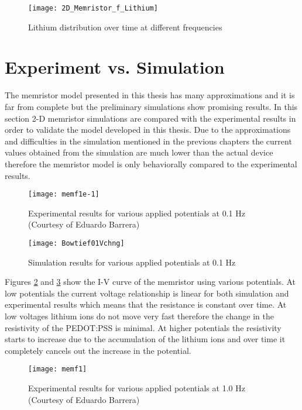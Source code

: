 \begin{doublespace}
\begin{figure}[!htp]
\centering
\texttt{[image: 2D\_Memristor\_f\_Lithium]}
\caption{Lithium distribution over time at different frequencies} 
\label{flit}
\end{figure}


\clearpage
\section{Experiment vs. Simulation}

The memristor model presented in this thesis has many approximations and it is far from complete but the preliminary simulations show promising results. In this section 2-D memristor simulations are compared with the experimental results in order to validate the model developed in this thesis. Due to the approximations and difficulties in the simulation mentioned in the previous chapters the current values obtained from the simulation are much lower than the actual device therefore the memristor model is only behaviorally compared to the experimental results. 


\begin{figure}[!htp]
\centering
\texttt{[image: memf1e-1]}
\caption{Experimental results for various applied potentials at 0.1 Hz (Courtesy of Eduardo Barrera)} 
\label{memf1e-1}
\end{figure}

\begin{figure}[!htp]
\centering
\texttt{[image: Bowtief01Vchng]}
\caption{Simulation results for various applied potentials at 0.1 Hz} 
\label{Bowtief01Vchng}
\end{figure}

Figures \ref{memf1e-1} and \ref{Bowtief01Vchng} show the I-V curve of the memristor using various potentials. At low potentials the current voltage relationship is linear for both simulation and experimental results which means that the resistance is constant over time. At low voltages lithium ions do not move very fast therefore the change in the resistivity of the PEDOT:PSS is minimal. At higher potentials the resistivity starts to increase due to the accumulation of the lithium ions and over time it completely cancels out the increase in the potential. 

\begin{figure}[!htp]
\centering
\texttt{[image: memf1]}
\caption{Experimental results for various applied potentials at 1.0 Hz (Courtesy of Eduardo Barrera)} 
\label{memf1}
\end{figure}


\end{doublespace}
